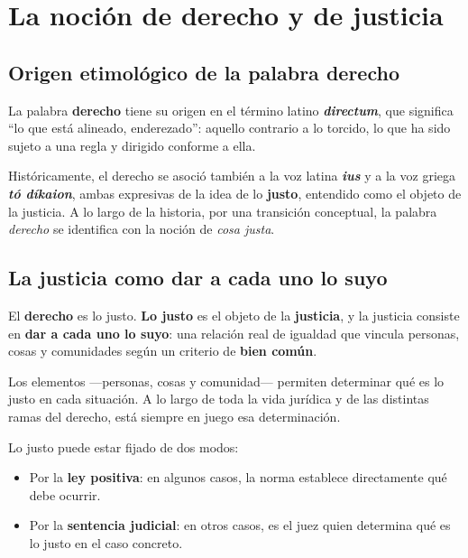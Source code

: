 \documentclass[12pt, a4paper]{report}
\begin{document}
\tableofcontents
\clearpage

\chapter{La noción de derecho y de justicia}

\section{Origen etimológico de la palabra derecho}

La palabra \textbf{derecho} tiene su origen en el término latino
\textbf{\textit{directum}}, que significa ``lo que está alineado, enderezado'':
aquello contrario a lo torcido, lo que ha sido sujeto a una regla y dirigido
conforme a ella.

\begin{definition}
Históricamente, el derecho se asoció también a la voz latina \textbf{\textit{ius}}
y a la voz griega \textbf{\textit{tó díkaion}}, ambas expresivas de la idea de lo
\textbf{justo}, entendido como el objeto de la justicia. A lo largo de la
historia, por una transición conceptual, la palabra \textit{derecho} se identifica
con la noción de \textit{cosa justa}.
\end{definition}

\section{La justicia como dar a cada uno lo suyo}

\begin{definition}
El \textbf{derecho} es lo justo. \textbf{Lo justo} es el objeto de la
\textbf{justicia}, y la justicia consiste en \textbf{dar a cada uno lo suyo}:
una relación real de igualdad que vincula personas, cosas y comunidades según
un criterio de \textbf{bien común}.
\end{definition}

Los elementos ---personas, cosas y comunidad--- permiten determinar qué es lo
justo en cada situación. A lo largo de toda la vida jurídica y de las distintas
ramas del derecho, está siempre en juego esa determinación.

Lo justo puede estar fijado de dos modos:

\begin{itemize}
  \item Por la \textbf{ley positiva}: en algunos casos, la norma establece
        directamente qué debe ocurrir.
  \item Por la \textbf{sentencia judicial}: en otros casos, es el juez quien
        determina qué es lo justo en el caso concreto.
\end{itemize}
\end{document}
